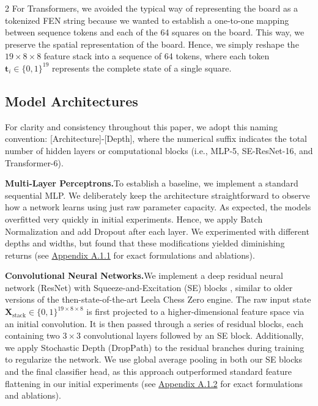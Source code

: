 \documentclass[a4paper,10pt]{article}
\begin{document}
\begin{multicols*}{2}
For Transformers, we avoided the typical way of representing the board as a tokenized FEN string because we wanted to establish a one-to-one mapping between sequence tokens and each of the 64 squares on the board. This way, we preserve the spatial representation of the board. Hence, we simply reshape the $19 \times 8 \times 8$ feature stack into a sequence of 64 tokens, where each token $\mathbf{t}_i \in \{0, 1\}^{19}$ represents the complete state of a single square.

\subsection{Model Architectures}
For clarity and consistency throughout this paper, we adopt this naming convention: [Architecture]-[Depth], where the numerical suffix indicates the total number of hidden layers or computational blocks (i.e., MLP-5, SE-ResNet-16, and Transformer-6).

\textbf{Multi-Layer Perceptrons.}\enskip To establish a baseline, we implement a standard sequential MLP. We deliberately keep the architecture straightforward to observe how a network learns using just raw parameter capacity. As expected, the models overfitted very quickly in initial experiments. Hence, we apply Batch Normalization \cite{ioffe2015batch} and add Dropout \cite{srivastava2014dropout} after each layer. We experimented with different depths and widths, but found that these modifications yielded diminishing returns (see \hyperref[mlp_details]{Appendix A.1.1} for exact formulations and ablations).

\textbf{Convolutional Neural Networks.}\enskip We implement a deep residual neural network (ResNet) \cite{he2016deep} with Squeeze-and-Excitation (SE) blocks \cite{hu2018squeeze}, similar to older versions of the then-state-of-the-art Leela Chess Zero engine. The raw input state $\mathbf{X}_{\text{stack}} \in \{0, 1\}^{19 \times 8 \times 8}$ is first projected to a higher-dimensional feature space via an initial convolution. It is then passed through a series of residual blocks, each containing two $3 \times 3$ convolutional layers followed by an SE block. Additionally, we apply Stochastic Depth \cite{huang2016deep} ($\text{DropPath}$) to the residual branches during training to regularize the network. We use global average pooling in both our SE blocks and the final classifier head, as this approach outperformed standard feature flattening in our initial experiments (see \hyperref[cnn_details]{Appendix A.1.2} for exact formulations and ablations).


\end{multicols*}
\end{document}
